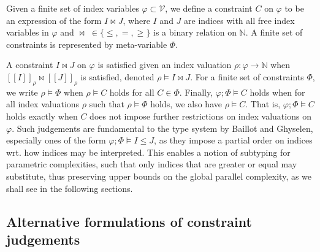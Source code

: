 \begin{definition}\label{def:indexconstr}
    Given a finite set of index variables $\varphi\subset \mathcal{V}$, we define a constraint $C$ on $\varphi$ to be an expression of the form $I \bowtie J$, where $I$ and $J$ are indices with all free index variables in $\varphi$ and $\bowtie\;\in\{\leq,=,\geq\}$ is a binary relation on $\mathbb{N}$. A finite set of constraints is represented by meta-variable $\Phi$.
\end{definition}
%
A constraint $I \bowtie J$ on $\varphi$ is satisfied given an index valuation $\rho : \varphi \longrightarrow \mathbb{N}$ when $[\![I]\!]_\rho \bowtie [\![J]\!]_\rho$ is satisfied, denoted $\rho \vDash I \bowtie J$. For a finite set of constraints $\Phi$, we write $\rho\vDash \Phi$ when $\rho \vDash C$ holds for all $C \in \Phi$. Finally, $\varphi;\Phi\vDash C$ holds when for all index valuations $\rho$ such that $\rho\vDash \Phi$ holds, we also have $\rho\vDash C$. That is, $\varphi;\Phi\vDash C$ holds exactly when $C$ does not impose further restrictions on index valuations on $\varphi$. Such judgements are fundamental to the type system by Baillot and Ghyselen, especially ones of the form $\varphi;\Phi\vDash I \leq J$, as they impose a partial order on indices wrt. how indices may be interpreted. This enables a notion of subtyping for parametric complexities, such that only indices that are greater or equal may substitute, thus preserving upper bounds on the global parallel complexity, as we shall see in the following sections.

\subsection{Alternative formulations of constraint judgements}\label{sec:cjalternativeform}

